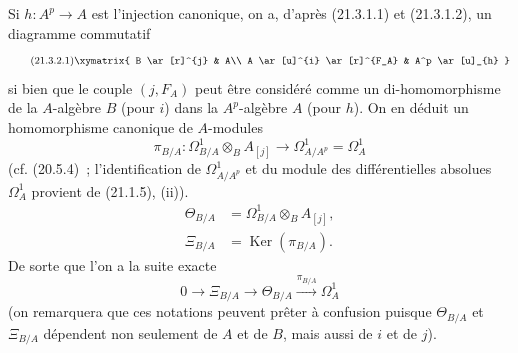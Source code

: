 \begin{env}[21.3.2]
\label{0.21.3.2-fr}
Si $h:A^p\to A$ est l'injection canonique, on a, d'après (21.3.1.1) et
(21.3.1.2), un diagramme commutatif
\begin{equation}
\tag{21.3.2.1}\label{0.21.3.2.1-fr}
\xymatrix{
 B \ar[r]^{j} & A\\
 A \ar[u]^{i} \ar[r]^{F_A} & A^p \ar[u]_{h}
}
\end{equation}
si bien que le couple $(j,F_A)$ peut être considéré comme un di-homomorphisme
de la $A$-algèbre $B$ (pour $i$) dans la $A^p$-algèbre $A$ (pour $h$).
On en déduit un homomorphisme canonique de $A$-modules
\begin{equation}
\tag{21.3.2.2}\label{0.21.3.2.2-fr}
\pi_{B/A}:\Omega^1_{B/A}\otimes_B A_{[j]}\longrightarrow
\Omega^1_{A/A^p}=\Omega^1_A
\end{equation}
(cf. (20.5.4)~; l'identification de $\Omega^1_{A/A^p}$ et du module des
différentielles absolues $\Omega^1_A$ provient de (21.1.5), (ii)).
\begin{align}
\tag{21.3.2.3}\label{0.21.3.2.3-fr}
\Theta_{B/A}&=\Omega^1_{B/A}\otimes_B A_{[j]},\\
\tag{21.3.2.4}\label{0.21.3.2.4-fr}
\Xi_{B/A}&=\operatorname{Ker}(\pi_{B/A}).
\end{align}
De sorte que l'on a la suite exacte
\begin{equation}
\tag{21.3.2.5}\label{0.21.3.2.5-fr}
0\to\Xi_{B/A}\to\Theta_{B/A}\xrightarrow{\pi_{B/A}}\Omega^1_A
\end{equation}
(on remarquera que ces notations peuvent prêter à confusion puisque
$\Theta_{B/A}$ et $\Xi_{B/A}$ dépendent non seulement de $A$ et de $B$,
mais aussi de $i$ et de $j$).
\end{env}

